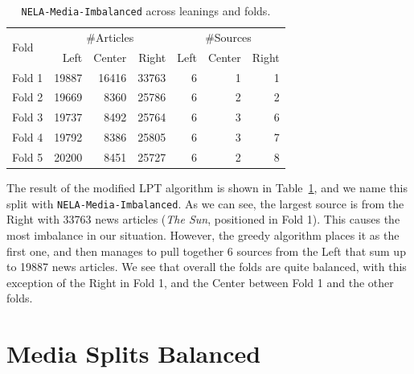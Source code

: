 

\begin{table}[!htbp]
    \centering
    \begin{tabular}{l|rrr|rrr}
        \multirow{2}{*}{Fold} & \multicolumn{3}{c}{\#Articles} & \multicolumn{3}{c}{\#Sources}                                 \\
                              & Left                           & Center                        & Right & Left & Center & Right \\
        \hline
        Fold 1                & 19887                          & 16416                         & 33763 & 6    & 1      & 1     \\
        Fold 2                & 19669                          & 8360                          & 25786 & 6    & 2      & 2     \\
        Fold 3                & 19737                          & 8492                          & 25764 & 6    & 3      & 6     \\
        Fold 4                & 19792                          & 8386                          & 25805 & 6    & 3      & 7     \\
        Fold 5                & 20200                          & 8451                          & 25727 & 6    & 2      & 8     \\
    \end{tabular}
    \caption{\texttt{NELA-Media-Imbalanced} across leanings and folds.}
    \label{tab:nela_media_imbalanced}
\end{table}

The result of the modified LPT algorithm is shown in Table~\ref{tab:nela_media_imbalanced}, and we name this split with \texttt{NELA-Media-Imbalanced}.
As we can see, the largest source is from the Right with 33763 news articles (\emph{The Sun}, positioned in Fold 1). This causes the most imbalance in our situation. However, the greedy algorithm places it as the first one, and then manages to pull together 6 sources from the Left that sum up to 19887 news articles.
We see that overall the folds are quite balanced, with this exception of the Right in Fold 1, and the Center between Fold 1 and the other folds.

\section{Media Splits Balanced}

